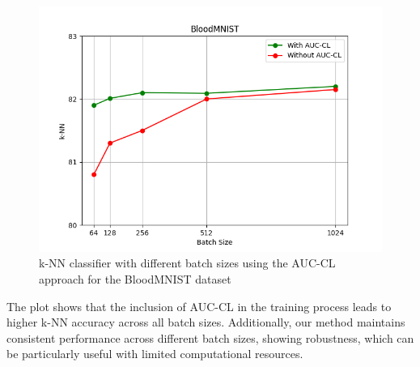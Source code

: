 \begin{figure}[hbt]
\centering
\includegraphics[width=\textwidth]{figs/accuracy_comparison.png}
\caption{
k-NN classifier with different batch sizes using the AUC-CL approach for the BloodMNIST dataset
}
\label{fig:knn_comparison}
\end{figure}


The plot  shows that the inclusion of AUC-CL in the training process leads to higher k-NN accuracy across all batch sizes. 
Additionally, our method maintains consistent performance across different batch sizes, showing robustness, which can be particularly useful with limited computational resources.



